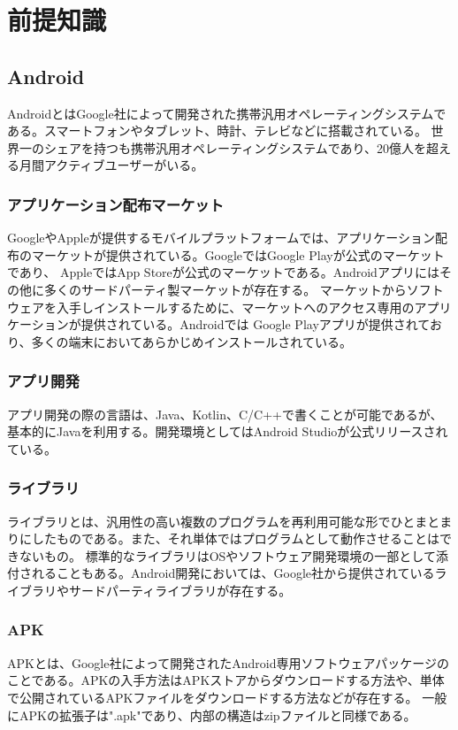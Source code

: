 \documentclass[a4j]{jarticle}
\begin{document}
\newpage
\section{前提知識}
\subsection{Android}
AndroidとはGoogle社によって開発された携帯汎用オペレーティングシステムである。スマートフォンやタブレット、時計、テレビなどに搭載されている。
世界一のシェアを持つも携帯汎用オペレーティングシステムであり、20億人を超える月間アクティブユーザーがいる。
\subsubsection{アプリケーション配布マーケット}
GoogleやAppleが提供するモバイルプラットフォームでは、アプリケーション配布のマーケットが提供されている。GoogleではGoogle Playが公式のマーケットであり、
AppleではApp Storeが公式のマーケットである。Androidアプリにはその他に多くのサードパーティ製マーケットが存在する。
マーケットからソフトウェアを入手しインストールするために、マーケットへのアクセス専用のアプリケーションが提供されている。Androidでは
Google Playアプリが提供されており、多くの端末においてあらかじめインストールされている。
\subsubsection{アプリ開発}
アプリ開発の際の言語は、Java、Kotlin、C/C++で書くことが可能であるが、基本的にJavaを利用する。開発環境としてはAndroid Studioが公式リリースされている。
\subsubsection{ライブラリ}
ライブラリとは、汎用性の高い複数のプログラムを再利用可能な形でひとまとまりにしたものである。また、それ単体ではプログラムとして動作させることはできないもの。
標準的なライブラリはOSやソフトウェア開発環境の一部として添付されることもある。Android開発においては、Google社から提供されているライブラリやサードパーティライブラリが存在する。
\subsubsection{APK}
APKとは、Google社によって開発されたAndroid専用ソフトウェアパッケージのことである。APKの入手方法はAPKストアからダウンロードする方法や、単体で公開されているAPKファイルをダウンロードする方法などが存在する。
一般にAPKの拡張子は".apk"であり、内部の構造はzipファイルと同様である。
\end{document}
